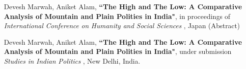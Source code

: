 \begin{enumerate}[label={[P\arabic*]}]  
    \item Devesh Marwah, Aniket Alam, \textbf{``The High and The Low: A Comparative Analysis of Mountain and Plain Polities in India"}, in proceedings of {\it International Conference on Humanity and Social Sciences }, Japan (Abstract)
    
    \item Devesh Marwah, Aniket Alam, \textbf{``The High and The Low: A Comparative Analysis of Mountain and Plain Polities in India"}, under submission {\it Studies in Indian Politics }, New Delhi, India.
    
\end{enumerate}
